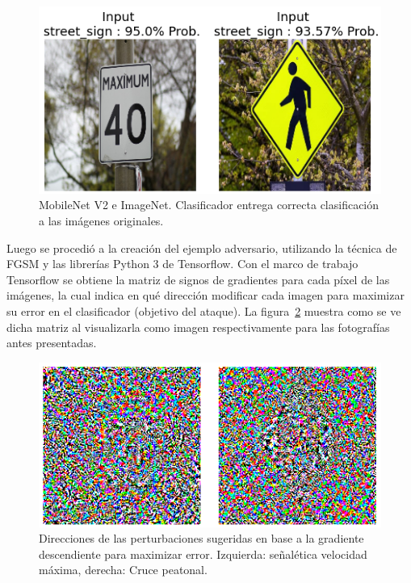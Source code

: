 \begin{figure}[!h]
\centering
\includegraphics[scale = 1]{Figures/figura_45.PNG}
\decoRule
\caption[Ejemplo MobileNet V2 e ImageNet clasificación imágenes]{MobileNet V2 e ImageNet. Clasificador entrega correcta clasificación a las imágenes originales.}
\label{fig:45}
\end{figure}

Luego se procedió a la creación del ejemplo adversario, utilizando  la técnica de FGSM y las librerías Python 3 de Tensorflow. Con el marco de trabajo Tensorflow se obtiene la matriz de signos de gradientes para cada píxel de las imágenes, la cual indica en qué dirección modificar cada  imagen para maximizar su error en el clasificador (objetivo del ataque). La figura~\ref{fig:46} muestra como se ve dicha matriz al visualizarla como imagen respectivamente para las fotografías antes presentadas.

\begin{figure}[!h]
\centering
\includegraphics[scale = 1]{Figures/figura_46.PNG}
\decoRule
\caption[Ejemplo MobileNet V2 e ImageNet ataque FGSM]{Direcciones de las perturbaciones sugeridas en base a la gradiente descendiente para maximizar error. Izquierda: señalética velocidad máxima, derecha: Cruce peatonal.}
\label{fig:46}
\end{figure}

